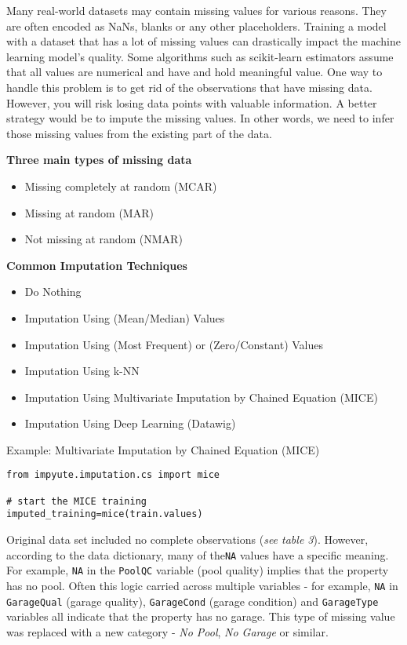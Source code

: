 \documentclass[
]{article}
\providecommand{\tightlist}{%
  \setlength{\itemsep}{0pt}\setlength{\parskip}{0pt}}
\begin{document}
Many real-world datasets may contain missing values for various reasons.
They are often encoded as NaNs, blanks or any other placeholders.
Training a model with a dataset that has a lot of missing values can
drastically impact the machine learning model's quality. Some algorithms
such as scikit-learn estimators assume that all values are numerical and
have and hold meaningful value. One way to handle this problem is to get
rid of the observations that have missing data. However, you will risk
losing data points with valuable information. A better strategy would be
to impute the missing values. In other words, we need to infer those
missing values from the existing part of the data.

\textbf{Three main types of missing data}

\begin{itemize}
\tightlist
\item
  Missing completely at random (MCAR)
\item
  Missing at random (MAR)
\item
  Not missing at random (NMAR)
\end{itemize}

\textbf{Common Imputation Techniques}

\begin{itemize}
\tightlist
\item
  Do Nothing
\item
  Imputation Using (Mean/Median) Values
\item
  Imputation Using (Most Frequent) or (Zero/Constant) Values
\item
  Imputation Using k-NN
\item
  Imputation Using Multivariate Imputation by Chained Equation (MICE)
\item
  Imputation Using Deep Learning (Datawig)
\end{itemize}

Example: Multivariate Imputation by Chained Equation (MICE)

\begin{verbatim}
from impyute.imputation.cs import mice

# start the MICE training
imputed_training=mice(train.values)
\end{verbatim}

Original data set included no complete observations (\emph{see table
3}). However, according to the data dictionary, many of the\texttt{NA}
values have a specific meaning. For example, \texttt{NA} in the
\texttt{PoolQC} variable (pool quality) implies that the property has no
pool. Often this logic carried across multiple variables - for example,
\texttt{NA} in \texttt{GarageQual} (garage quality), \texttt{GarageCond}
(garage condition) and \texttt{GarageType} variables all indicate that
the property has no garage. This type of missing value was replaced with
a new category - \emph{No Pool}, \emph{No Garage} or similar.
\end{document}
